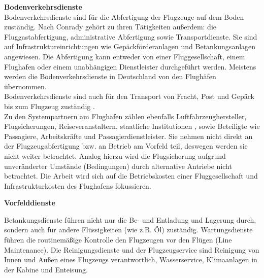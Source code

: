 \textbf{Bodenverkehrsdienste} \\ %
Bodenverkehrsdienste sind für die Abfertigung der Flugzeuge auf dem Boden zuständig. 
Nach Conrady \cite{conrady2019luftverkehr} gehört zu ihren Tätigkeiten außerdem:  
die Fluggastabfertigung, administrative Abfertigung sowie Transportdienste.
Sie sind auf Infrastruktureinrichtungen wie Gepäckförderanlagen und Betankungsanlagen angewiesen. 
Die Abfertigung kann entweder von einer Fluggesellschaft, einem Flughafen oder einem unabhängigen Dienstleister durchgeführt werden. 
Meistens werden die Bodenverkehrsdienste in Deutschland von den Flughäfen übernommen. \\ %
%
Bodenverkehrsdienste sind auch für den Transport von Fracht, Post und Gepäck bis zum Flugzeug zuständig \cite{mensen2013handbuch}.\\
%

%
Zu den Systempartnern am Flughafen zählen ebenfalls Luftfahrzeughersteller, Flugsicherungen, Reiseveranstaltern, staatliche Institutionen \cite{maertens2023neue},
sowie Beteiligte wie Passagiere, Arbeitskräfte und Passagierdienstleister. 
Sie nehmen nicht direkt an der Flugzeugabfertigung bzw. an Betrieb am Vorfeld teil, deswegen werden sie nicht weiter betrachtet.
Analog hierzu wird die Flugsicherung aufgrund unveränderter Umstände (Bedingungen) durch alternative Antriebe nicht betrachtet. 
Die Arbeit wird sich auf die Betriebskosten einer Fluggesellschaft und Infrastrukturkosten des Flughafens fokussieren.
%

\textbf{Vorfelddienste}

Betankungsdienste führen nicht nur die Be- und Entladung und Lagerung durch, sondern auch für andere Flüssigkeiten (wie z.B. Öl) zuständig.
Wartungsdienste führen die routinemäßige Kontrolle den Flugzeugen vor den Flügen (Line Maintenance).
Die Reinigungsdienste und der Flugzeugservice sind Reinigung von Innen und Außen eines Flugzeugs verantwortlich, Wasserservice, 
Klimaanlagen in der Kabine und Enteisung.

